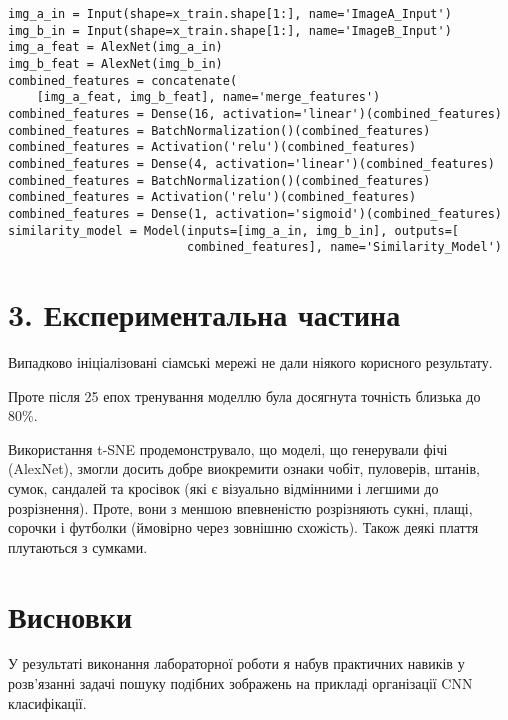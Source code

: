 \documentclass{/home/alx/Documents/LaTex/nulp}
\begin{document}
\begin{verbatim}
img_a_in = Input(shape=x_train.shape[1:], name='ImageA_Input')
img_b_in = Input(shape=x_train.shape[1:], name='ImageB_Input')
img_a_feat = AlexNet(img_a_in)
img_b_feat = AlexNet(img_b_in)
combined_features = concatenate(
    [img_a_feat, img_b_feat], name='merge_features')
combined_features = Dense(16, activation='linear')(combined_features)
combined_features = BatchNormalization()(combined_features)
combined_features = Activation('relu')(combined_features)
combined_features = Dense(4, activation='linear')(combined_features)
combined_features = BatchNormalization()(combined_features)
combined_features = Activation('relu')(combined_features)
combined_features = Dense(1, activation='sigmoid')(combined_features)
similarity_model = Model(inputs=[img_a_in, img_b_in], outputs=[
                         combined_features], name='Similarity_Model')
\end{verbatim}

\section*{3. Експериментальна частина}

Випадково ініціалізовані сіамські мережі не дали ніякого корисного результату.

\begin{center}
\end{center}

Проте після 25 епох тренування моделлю була досягнута точність близька до 80\%.

\begin{center}
\end{center}

\begin{center}
\end{center}

Використання t-SNE продемонструвало, що моделі, що генерували фічі (AlexNet), змогли досить добре виокремити ознаки чобіт, пуловерів, штанів, сумок, сандалей та кросівок (які є візуально відмінними і легшими до розрізнення). Проте, вони з меншою впевненістю розрізняють сукні, плащі, сорочки і футболки (ймовірно через зовнішню схожість). Також деякі плаття плутаються з сумками.

\begin{center}
\end{center}

\section*{Висновки}
У результаті виконання лабораторної роботи я набув практичних навиків у розв’язанні задачі пошуку подібних зображень на прикладі організації CNN класифікації.
\end{document}

